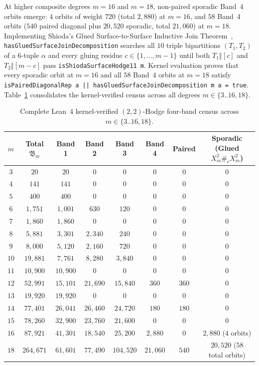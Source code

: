 \documentclass[11pt,a4paper]{article}
\begin{document}
At higher composite degrees $m = 16$ and $m = 18$, non-paired sporadic Band~4 orbits emerge: $4$ orbits of weight $720$ (total $2{,}880$) at $m = 16$, and $58$ Band~4 orbits ($540$ paired diagonal plus $20{,}520$ sporadic, total $21{,}060$) at $m = 18$. Implementing Shioda's Glued Surface-to-Surface Inductive Join Theorem~\cite[Theorem~3.1]{Shioda1979}, \texttt{hasGluedSurfaceJoinDecomposition} searches all $10$ triple bipartitions $(T_1, T_2)$ of a $6$-tuple $\alpha$ and every gluing residue $c \in \{1, \dots, m - 1\}$ until both $T_1 \mathbin{\Vert} [c]$ and $T_2 \mathbin{\Vert} [m - c]$ pass \texttt{isShiodaSurfaceHodge11 m}. Kernel evaluation proves that every sporadic orbit at $m = 16$ and all $58$ Band~4 orbits at $m = 18$ satisfy \texttt{isPairedDiagonalRep a || hasGluedSurfaceJoinDecomposition m a = true}. Table~\ref{tab:full_census} consolidates the kernel-verified census across all degrees $m \in \{3..16, 18\}$.

\begin{table}[htbp]
  \centering
  \scriptsize
  \setlength{\tabcolsep}{4pt}
  \caption{Complete Lean~4 kernel-verified $(2,2)$-Hodge four-band census across $m \in \{3..16, 18\}$.}
  \label{tab:full_census}
  \begin{tabular}{cccccccc}
    \toprule
    $m$ & Total $\mathfrak{B}_m$ & Band 1 & Band 2 & Band 3 & Band 4 & Paired & Sporadic (Glued $X_m^2 \#_c X_m^2$) \\
    \midrule
    $3$ & $20$ & $20$ & $0$ & $0$ & $0$ & $0$ & $0$ \\
    $4$ & $141$ & $141$ & $0$ & $0$ & $0$ & $0$ & $0$ \\
    $5$ & $400$ & $400$ & $0$ & $0$ & $0$ & $0$ & $0$ \\
    $6$ & $1{,}751$ & $1{,}001$ & $630$ & $120$ & $0$ & $0$ & $0$ \\
    $7$ & $1{,}860$ & $1{,}860$ & $0$ & $0$ & $0$ & $0$ & $0$ \\
    $8$ & $5{,}881$ & $3{,}301$ & $2{,}340$ & $240$ & $0$ & $0$ & $0$ \\
    $9$ & $8{,}000$ & $5{,}120$ & $2{,}160$ & $720$ & $0$ & $0$ & $0$ \\
    $10$ & $19{,}881$ & $7{,}761$ & $8{,}280$ & $3{,}840$ & $0$ & $0$ & $0$ \\
    $11$ & $10{,}900$ & $10{,}900$ & $0$ & $0$ & $0$ & $0$ & $0$ \\
    $12$ & $52{,}991$ & $15{,}101$ & $21{,}690$ & $15{,}840$ & $360$ & $360$ & $0$ \\
    $13$ & $19{,}920$ & $19{,}920$ & $0$ & $0$ & $0$ & $0$ & $0$ \\
    $14$ & $77{,}401$ & $26{,}041$ & $26{,}460$ & $24{,}720$ & $180$ & $180$ & $0$ \\
    $15$ & $78{,}260$ & $32{,}900$ & $23{,}760$ & $21{,}600$ & $0$ & $0$ & $0$ \\
    $16$ & $87{,}921$ & $41{,}301$ & $18{,}540$ & $25{,}200$ & $2{,}880$ & $0$ & $2{,}880$ ($4$ orbits) \\
    $18$ & $264{,}671$ & $61{,}601$ & $77{,}490$ & $104{,}520$ & $21{,}060$ & $540$ & $20{,}520$ ($58$ total orbits) \\
    \bottomrule
  \end{tabular}
\end{table}
\end{document}
